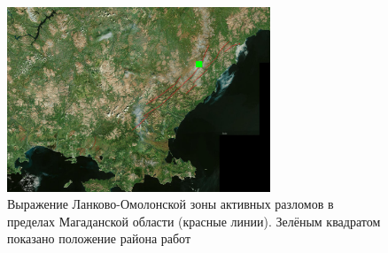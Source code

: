 \begin{figure}[H]
  \begin{center}
    \includegraphics[width=0.7\textwidth]{authors/kondratev-fig1.png}
  \end{center}
  \caption {
	  Выражение Ланково-Омолонской зоны активных разломов в пределах Магаданской области (красные линии). Зелёным квадратом показано положение района работ
}

\end{figure}

